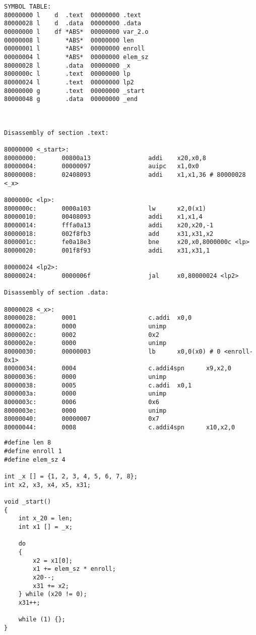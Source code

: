 \begin{lstlisting}[label=some-code-2,caption=Дизассемблированный истинг исходной программы]
SYMBOL TABLE:
80000000 l    d  .text  00000000 .text
80000028 l    d  .data  00000000 .data
00000000 l    df *ABS*  00000000 var_2.o
00000008 l       *ABS*  00000000 len
00000001 l       *ABS*  00000000 enroll
00000004 l       *ABS*  00000000 elem_sz
80000028 l       .data  00000000 _x
8000000c l       .text  00000000 lp
80000024 l       .text  00000000 lp2
80000000 g       .text  00000000 _start
80000048 g       .data  00000000 _end



Disassembly of section .text:

80000000 <_start>:
80000000:       00800a13                addi    x20,x0,8
80000004:       00000097                auipc   x1,0x0
80000008:       02408093                addi    x1,x1,36 # 80000028 <_x>

8000000c <lp>:
8000000c:       0000a103                lw      x2,0(x1)
80000010:       00408093                addi    x1,x1,4
80000014:       fffa0a13                addi    x20,x20,-1
80000018:       002f8fb3                add     x31,x31,x2
8000001c:       fe0a18e3                bne     x20,x0,8000000c <lp>
80000020:       001f8f93                addi    x31,x31,1

80000024 <lp2>:
80000024:       0000006f                jal     x0,80000024 <lp2>

Disassembly of section .data:

80000028 <_x>:
80000028:       0001                    c.addi  x0,0
8000002a:       0000                    unimp
8000002c:       0002                    0x2
8000002e:       0000                    unimp
80000030:       00000003                lb      x0,0(x0) # 0 <enroll-0x1>
80000034:       0004                    c.addi4spn      x9,x2,0
80000036:       0000                    unimp
80000038:       0005                    c.addi  x0,1
8000003a:       0000                    unimp
8000003c:       0006                    0x6
8000003e:       0000                    unimp
80000040:       00000007                0x7
80000044:       0008                    c.addi4spn      x10,x2,0
\end{lstlisting}

\begin{lstlisting}[label=some-code-3,caption=Псевдокод на языке C эквивалентной программы]
#define len 8
#define enroll 1
#define elem_sz 4

int _x [] = {1, 2, 3, 4, 5, 6, 7, 8};
int x2, x3, x4, x5, x31;

void _start()
{
    int x_20 = len;
    int x1 [] = _x;

    do
    {
        x2 = x1[0];
        x1 += elem_sz * enroll;
        x20--;
        x31 += x2;
    } while (x20 != 0);
    x31++;

    while (1) {};
}
\end{lstlisting}

